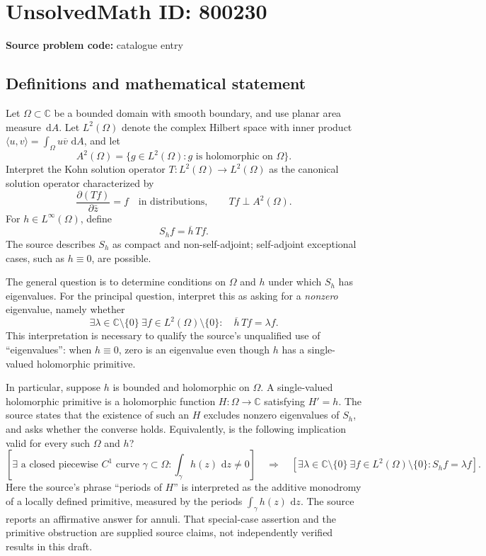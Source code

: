 \documentclass[11pt]{article}
\newcommand{\C}{\mathbb{C}}
\newcommand{\dd}{\,\mathrm{d}}
\begin{document}
\section*{UnsolvedMath ID: 800230}
\textbf{Source problem code:} catalogue entry
\subsection{Definitions and mathematical statement}
Let \(\Omega\subset\C\) be a bounded domain with smooth boundary, and use planar area measure \(\dd A\). Let \(L^2(\Omega)\) denote the complex Hilbert space with inner product \(\langle u,v\rangle=\int_\Omega u\overline v\,\dd A\), and let
\[
A^2(\Omega)=\{g\in L^2(\Omega):g\text{ is holomorphic on }\Omega\}.
\]
Interpret the Kohn solution operator \(T:L^2(\Omega)\to L^2(\Omega)\) as the canonical solution operator characterized by
\[
\frac{\partial(Tf)}{\partial\bar z}=f\quad\text{in distributions},\qquad Tf\perp A^2(\Omega).
\]
For \(h\in L^\infty(\Omega)\), define
\[
S_h f=\overline h\,Tf.
\]
The source describes \(S_h\) as compact and non-self-adjoint; self-adjoint exceptional cases, such as \(h\equiv0\), are possible.

The general question is to determine conditions on \(\Omega\) and \(h\) under which \(S_h\) has eigenvalues. For the principal question, interpret this as asking for a \emph{nonzero} eigenvalue, namely whether
\[
\exists\lambda\in\C\setminus\{0\}\ \exists f\in L^2(\Omega)\setminus\{0\}:\quad \overline h\,Tf=\lambda f.
\]
This interpretation is necessary to qualify the source's unqualified use of ``eigenvalues'': when \(h\equiv0\), zero is an eigenvalue even though \(h\) has a single-valued holomorphic primitive.

In particular, suppose \(h\) is bounded and holomorphic on \(\Omega\). A single-valued holomorphic primitive is a holomorphic function \(H:\Omega\to\C\) satisfying \(H'=h\). The source states that the existence of such an \(H\) excludes nonzero eigenvalues of \(S_h\), and asks whether the converse holds. Equivalently, is the following implication valid for every such \(\Omega\) and \(h\)?
\[
\left[\exists\text{ a closed piecewise }C^1\text{ curve }\gamma\subset\Omega:
\int_\gamma h(z)\,\dd z\ne0\right]
\quad\Longrightarrow\quad
\left[\exists\lambda\in\C\setminus\{0\}\ \exists f\in L^2(\Omega)\setminus\{0\}:S_hf=\lambda f\right].
\]
Here the source's phrase ``periods of \(H\)'' is interpreted as the additive monodromy of a locally defined primitive, measured by the periods \(\int_\gamma h(z)\,\dd z\). The source reports an affirmative answer for annuli. That special-case assertion and the primitive obstruction are supplied source claims, not independently verified results in this draft.
\end{document}
